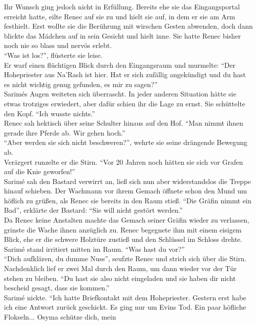 Ihr Wunsch ging jedoch nicht in Erfüllung. Bereits ehe sie das Eingangsportal erreicht hatte, eilte 
Renec auf sie zu und hielt sie auf, in dem er sie am Arm festhielt. Erst wollte sie die Berührung 
mit wirschen Gesten abwenden, doch dann blickte das Mädchen auf in sein Gesicht und hielt inne. Sie 
hatte Renec bisher noch nie so blass und nervös erlebt. \\
``Was ist los?'', flüsterte sie leise.\\
Er warf einen flüchtigen Blick durch den Eingangsraum und murmelte: ``Der Hohepriester aus Na'Rash 
ist hier. Hat er sich zufällig angekündigt und du hast es nicht wichtig genug gefunden, es mir zu 
sagen?''\\
Sarimés Augen weiteten sich überrascht. In jeder anderen Situation hätte sie etwas trotziges 
erwiedert, aber dafür schien ihr die Lage zu ernst. Sie schüttelte den Kopf. ``Ich wusste 
nichts.''\\
Renec sah hektisch über seine Schulter hinaus auf den Hof. ``Man nimmt ihnen gerade ihre Pferde ab. 
Wir gehen hoch.''\\
``Aber werden sie sich nicht beschweren?'', wehrte sie seine drängende Bewegung ab.\\
Verärgert runzelte er die Stirn. ``Vor 20 Jahren noch hätten sie sich vor Grafen auf die Knie 
geworfen!''\\
Sarimé sah den Bastard verwirrt an, ließ sich nun aber widerstandslos die Treppe hinauf schieben. 
Der Wachmann vor ihrem Gemach öffnete schon den Mund um höflich zu grüßen, als Renec sie bereits 
in den Raum stieß. ``Die Gräfin nimmt ein Bad'', erklärte der Bastard: 
``Sie will nicht gestört werden.''\\
Da Renec keine Anstalten machte das Gemach seiner Gräfin wieder zu verlassen, grinste die Wache 
ihnen anzüglich zu. Renec begegnete ihm mit einem eisigem Blick, ehe er die schwere Holztüre zustieß 
und den Schlüssel im Schloss drehte. \\
Sarimé stand irritiert mitten im Raum. ``Was hast du vor?''\\
``Dich aufklären, du dumme Nuss'', seufzte Renec und strich sich über die Stirn. Nachdenklich lief 
er zwei Mal durch den Raum, um dann wieder vor der Tür stehen zu bleiben. ``Du hast sie also nicht 
eingeladen und sie haben dir nicht bescheid gesagt, dass sie kommen.''\\
Sarimé nickte. ``Ich hatte Briefkontakt mit dem Hohepriester. Gestern erst habe ich eine Antwort 
zurück geschickt. Es ging nur um Evins Tod. Ein paar höfliche Flokseln... Osyma schütze dich, mein 
